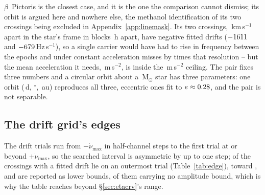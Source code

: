 $\beta$~Pictoris is the closest case, and it is the one the comparison
cannot dismiss; its orbit is argued here and nowhere else, the methanol
identification of its two crossings being excluded in
Appendix~\ref{app:linemask}. Its two crossings, \TjBpDvKms\,km\,s$^{-1}$ apart
in the star's frame in blocks \TjBpDtH\,h apart, have negative fitted drifts
($-1611$ and $-679$\,Hz\,s$^{-1}$), so a single carrier would
have had to rise in frequency between the epochs and under constant
acceleration misses by \TjBpNSig{} times that resolution -- but the mean
acceleration it needs, \TjBpAccelReq\,m\,s$^{-2}$, is inside the
\WdAGrid\,m\,s$^{-2}$ ceiling. The pair fixes three numbers and a circular
orbit about a \EcMassBp\,M$_\odot$ star \citep{Crifo1997} has three
parameters: one orbit (\ObDayBp\,d, \ObIncBp$^\circ$, \ObAuBp\,au) reproduces
all three, eccentric ones fit to $e\approx0.28$, and the pair is not
separable.


\subsection{The drift grid's edges}
\label{sec:edge}

The drift trials run from $-\dot\nu_{\max}$ in half-channel steps to the
first trial at or beyond $+\dot\nu_{\max}$, so the searched interval is
asymmetric by up to one step; \EgNEdge{} of the \EgNDrift{} crossings with a
fitted drift lie on an outermost trial (Table~\ref{tab:edge}), toward
\EgEdgeStars, and are reported as lower bounds, \EgNEdgeOut{} of them carrying
no amplitude bound, which is why the table reaches beyond
\S\ref{sec:etacrv}'s range.

